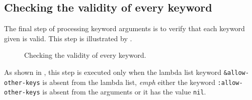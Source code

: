 \subsection{Checking the validity of every keyword}

The final step of processing keyword arguments is to verify that each
keyword given is valid.  This step is illustrated by
.

\begin{figure}
\begin{center}
\end{center}
\caption{\label{fig-check-every-keyword}
Checking the validity of every keyword.}
\end{figure}

As shown in , this step is executed only
when the lambda list keyword \texttt{\&allow-other-keys} is absent
from the lambda list, \emph{emph} either the keyword
\texttt{:allow-other-keys} is absent from the arguments or it has the
value \texttt{nil}.
